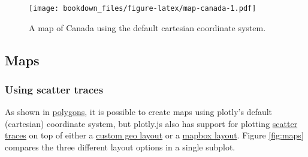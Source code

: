 \documentclass[12pt,]{isuthesis}
\newenvironment{Shaded}{\begin{snugshade}}{\end{snugshade}}
\newcommand{\KeywordTok}[1]{\textcolor[rgb]{0.13,0.29,0.53}{\textbf{{#1}}}}
\newcommand{\DataTypeTok}[1]{\textcolor[rgb]{0.13,0.29,0.53}{{#1}}}
\newcommand{\FloatTok}[1]{\textcolor[rgb]{0.00,0.00,0.81}{{#1}}}
\newcommand{\StringTok}[1]{\textcolor[rgb]{0.31,0.60,0.02}{{#1}}}
\newcommand{\OtherTok}[1]{\textcolor[rgb]{0.56,0.35,0.01}{{#1}}}
\newcommand{\NormalTok}[1]{{#1}}
\begin{document}
\begin{Shaded}
\end{Shaded}

\begin{figure}[htbp]
\centering
\texttt{[image: bookdown\_files/figure-latex/map-canada-1.pdf]}
\caption{\label{fig:map-canada}A map of Canada using the default cartesian
coordinate system.}
\end{figure}

\subsection{Maps}\label{maps}

\subsubsection{Using scatter traces}\label{using-scatter-traces}

As shown in \protect\hyperlink{polygons}{polygons}, it is possible to
create maps using plotly's default (cartesian) coordinate system, but
plotly.js also has support for plotting
\protect\hyperlink{scatter-traces}{scatter traces} on top of either a
\href{https://plot.ly/r/reference/\#layout-geo}{custom geo layout} or a
\href{https://plot.ly/r/reference/\#layout-mapbox}{mapbox layout}.
Figure \ref{fig:maps} compares the three different layout options in a
single subplot.
\end{document}
